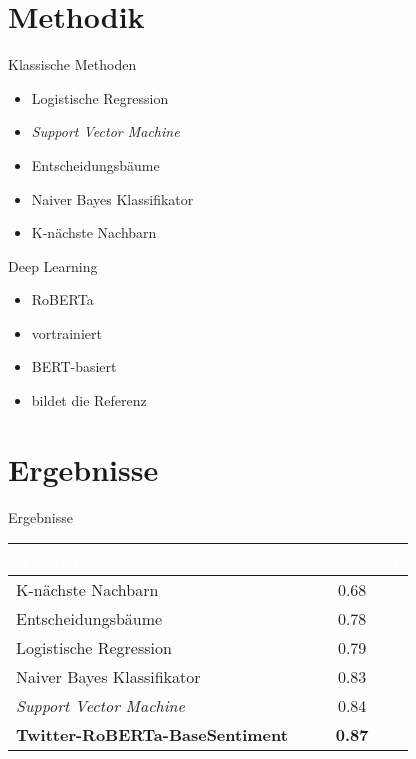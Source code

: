 \documentclass[aspectratio=169]{beamer} %
\begin{document}
\section{Methodik}

\begin{frame}{Klassische Methoden}
  \Large
  \begin{itemize}
      \item Logistische Regression
      \item \textit{Support Vector Machine}
      \item Entscheidungsbäume
      \item Naiver Bayes Klassifikator
      \item K-nächste Nachbarn
  \end{itemize}
\end{frame}

\begin{frame}{Deep Learning}
  \Large
  \begin{itemize}
      \item \glqq RoBERTa\grqq
      \item vortrainiert
      \item BERT-basiert
      \item bildet die Referenz
  \end{itemize}
\end{frame}

\section{Ergebnisse}

\begin{frame}{Ergebnisse}
  \Large
  \begin{tabularx}{\textwidth}{|X|c|}
      \hline
      \rowcolor{aigblue!40} %
      \textcolor{white}{\textbf{Algorithmus}} & \textcolor{white}{\textbf{Genauigkeit}} \\ \hline
      K-nächste Nachbarn & 0.68 \\ \hline
      Entscheidungsbäume & 0.78 \\ \hline
      Logistische Regression & 0.79 \\ \hline
      Naiver Bayes Klassifikator & 0.83 \\ \hline
      \textit{Support Vector Machine} & 0.84 \\ \hline
      \rowcolor{aigyellow!30} %
      \textbf{Twitter-RoBERTa-BaseSentiment } & \textbf{0.87} \\ \hline
  \end{tabularx}
\end{frame}
\end{document}
